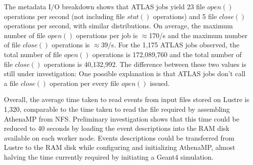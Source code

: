 The metadata I/O breakdown shows that ATLAS jobs yield 23 file \(open()\)
operations per second (not including file \(stat()\) operations) and 5 file
\(close()\) operations per second, with similar distributions. On average,
the maximum number of file \(open()\) operations per job is \(\approx\)170/s
and the maximum number of file \(close()\) operations is \(\approx\)39/s. For
the 1,175 ATLAS jobs observed, the total number of file \(open()\) operations
is 172,089,760 and the total number of file \(close()\) operations is
40,132,992. The difference between these two values is still under
investigation: One possible explanation is that ATLAS jobs don't call a file
\(close()\) operation per every file \(open()\) issued.

Overall, the average time taken to read events from input files stored on
Lustre is 1,320, comparable to the time taken to read the file required by
assembling AthenaMP from NFS\@. Preliminary investigation shows that this
time could be reduced to 40 seconds by loading the event descriptions into
the RAM disk available on each worker node. Events descriptions could be
transferred from Lustre to the RAM disk while configuring and initializing
AthenaMP, almost halving the time currently required by initiating a Geant4
simulation.
